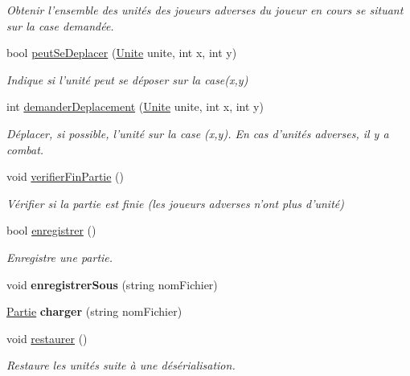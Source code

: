 \begin{DoxyCompactItemize}
\begin{DoxyCompactList}\small\item\em Obtenir l'ensemble des unités des joueurs adverses du joueur en cours se situant sur la case demandée. \end{DoxyCompactList}\item 
bool \hyperlink{class_small_world_1_1_partie_a8e2f3f866023c8a0e7b817cd6cd42552}{peut\-Se\-Deplacer} (\hyperlink{class_small_world_1_1_unite}{Unite} unite, int x, int y)
\begin{DoxyCompactList}\small\item\em Indique si l'unité peut se déposer sur la case(x,y) \end{DoxyCompactList}\item 
int \hyperlink{class_small_world_1_1_partie_a6496b6d4bf683541164126855524897b}{demander\-Deplacement} (\hyperlink{class_small_world_1_1_unite}{Unite} unite, int x, int y)
\begin{DoxyCompactList}\small\item\em Déplacer, si possible, l'unité sur la case (x,y). En cas d'unités adverses, il y a combat. \end{DoxyCompactList}\item 
void \hyperlink{class_small_world_1_1_partie_a64b2d8fa9405d2a1f588dfa5536bd7a4}{verifier\-Fin\-Partie} ()
\begin{DoxyCompactList}\small\item\em Vérifier si la partie est finie (les joueurs adverses n'ont plus d'unité) \end{DoxyCompactList}\item 
bool \hyperlink{class_small_world_1_1_partie_a823548e00d1af08c961e0667645d90a9}{enregistrer} ()
\begin{DoxyCompactList}\small\item\em Enregistre une partie. \end{DoxyCompactList}\item 
\hypertarget{class_small_world_1_1_partie_a88e81296352b0378cfe6fa18f8e0eca1}{void {\bfseries enregistrer\-Sous} (string nom\-Fichier)}\label{class_small_world_1_1_partie_a88e81296352b0378cfe6fa18f8e0eca1}

\item 
\hypertarget{class_small_world_1_1_partie_a68d6f7f1d5f1be9160291e4dea6305a5}{\hyperlink{class_small_world_1_1_partie}{Partie} {\bfseries charger} (string nom\-Fichier)}\label{class_small_world_1_1_partie_a68d6f7f1d5f1be9160291e4dea6305a5}

\item 
\hypertarget{class_small_world_1_1_partie_adcb2a60014c65303176714585cf7b853}{void \hyperlink{class_small_world_1_1_partie_adcb2a60014c65303176714585cf7b853}{restaurer} ()}\label{class_small_world_1_1_partie_adcb2a60014c65303176714585cf7b853}

\begin{DoxyCompactList}\small\item\em Restaure les unités suite à une désérialisation. \end{DoxyCompactList}\end{DoxyCompactItemize}
